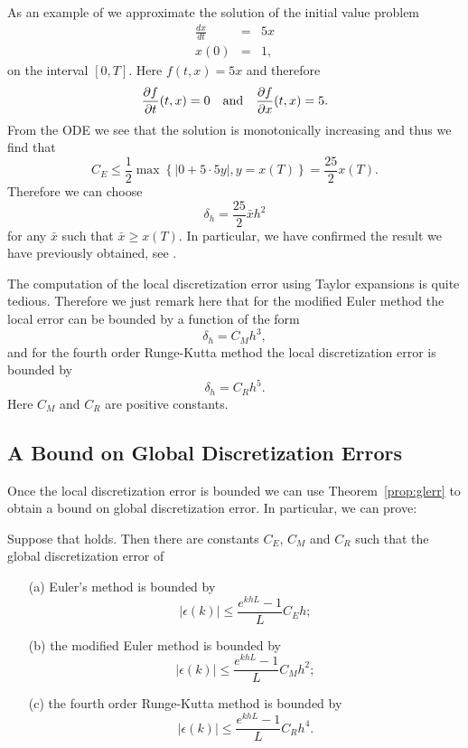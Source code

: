 \documentclass{ximera}
\begin{document}
As an example of  we approximate the solution of the initial 
value problem
\begin{eqnarray*}
\frac{dx}{dt} & = & 5 x\\
 x(0) & = & 1,
\end{eqnarray*}
on the interval $[0,T]$.  Here $f(t,x)=5 x$ and therefore
\[
\frac{\partial f}{\partial t}(t,x)=0\quad\mbox{and}\quad
\frac{\partial f}{\partial x}(t,x)=5.
\]
From the ODE we see that the solution is monotonically increasing
and thus we find that
\[
C_E\le \frac{1}{2}\max\left\{ \left\vert 0+5\cdot 5y\right\vert,
y=x(T) \right\} = \frac{25}{2}x(T).
\]
Therefore we can choose
\[
\delta_h = \frac{25}{2}\bar x h^2
\]
for any $\bar x$ such that $\bar x \ge x(T)$.  In particular,
we have confirmed the result we have previously obtained, 
see .

The computation of the local discretization error using Taylor expansions 
is quite tedious.  Therefore we just remark here that
for the modified Euler 
method 
the local error can be bounded by a function
of the form
\[
\delta_h = C_Mh^3,
\]
and for the fourth order Runge-Kutta 
method 
the local discretization error is bounded by
\[
\delta_h = C_R h^5.
\]
Here $C_M$ and $C_R$ are positive constants.  

\subsection*{A Bound on Global Discretization Errors}

Once the local discretization error is bounded we can use
Theorem~\ref{prop:glerr} to obtain a bound on global discretization 
error.  In particular, we can prove:
\begin{prop} \label{prop:errEMR}
Suppose that  holds.  Then there are constants $C_E$,
$C_M$ and $C_R$ such that the global discretization error of
\begin{itemize}
\item[(a)] 
Euler's method is bounded by
\[
|\epsilon(k)| \le \frac{e^{khL}-1}{L}C_E h;
\]
\item[(b)] 
the modified Euler method is bounded by
\[
|\epsilon(k)| \le \frac{e^{khL}-1}{L}C_M h^2;
\]
\item[(c)] 
the fourth order Runge-Kutta method is bounded by
\[
|\epsilon(k)| \le \frac{e^{khL}-1}{L}C_R h^4.
\]
\end{itemize}
\end{prop}
\end{document}
